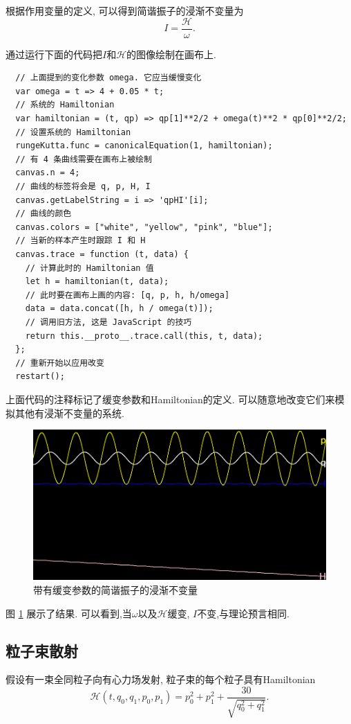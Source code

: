 \documentclass[12pt]{article}
\begin{document}
根据作用变量的定义,
可以得到简谐振子的浸渐不变量为\cite[p. 300]{arnold1989mathmech}\cite[p. 157]{landau1976mechanics}
\begin{equation*}
  I=\frac{\mathcal H}\omega.
\end{equation*}

通过运行下面的代码把$I$和$\mathcal H$的图像绘制在画布上.

\begin{verbatim}
  // 上面提到的变化参数 omega. 它应当缓慢变化
  var omega = t => 4 + 0.05 * t;
  // 系统的 Hamiltonian
  var hamiltonian = (t, qp) => qp[1]**2/2 + omega(t)**2 * qp[0]**2/2;
  // 设置系统的 Hamiltonian
  rungeKutta.func = canonicalEquation(1, hamiltonian);
  // 有 4 条曲线需要在画布上被绘制
  canvas.n = 4;
  // 曲线的标签将会是 q, p, H, I
  canvas.getLabelString = i => 'qpHI'[i];
  // 曲线的颜色
  canvas.colors = ["white", "yellow", "pink", "blue"];
  // 当新的样本产生时跟踪 I 和 H
  canvas.trace = function (t, data) {
    // 计算此时的 Hamiltonian 值
    let h = hamiltonian(t, data);
    // 此时要在画布上画的内容: [q, p, h, h/omega]
    data = data.concat([h, h / omega(t)]);
    // 调用旧方法, 这是 JavaScript 的技巧
    return this.__proto__.trace.call(this, t, data);
  };
  // 重新开始以应用改变
  restart();
\end{verbatim}

上面代码的注释标记了缓变参数和Hamiltonian的定义.
可以随意地改变它们来模拟其他有浸渐不变量的系统.

\begin{figure}[h]
  \centering
  \includegraphics[width=0.6\linewidth]{adiabatic.png}
  \caption{带有缓变参数的简谐振子的浸渐不变量}
  \label{fig:adiabatic}
\end{figure}

图 \ref{fig:adiabatic} 展示了结果.
可以看到,当$\omega$以及$\mathcal H$缓变, $I$不变,与理论预言相同.

\subsection{粒子束散射}

假设有一束全同粒子向有心力场发射,
粒子束的每个粒子具有Hamiltonian
\begin{equation*}
  \mathcal H\left(t,q_0,q_1,p_0,p_1\right)=p_0^2+p_1^2+\frac{30}{\sqrt{q_0^2+q_1^2}}.
\end{equation*}
\end{document}

